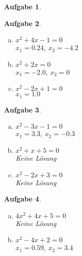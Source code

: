 \documentclass[12pt]{article}
\theoremstyle{note}
\newtheorem{aufgabe}{Aufgabe}
\begin{document}
\begin{flushleft}
\begin{aufgabe}
\begin{multicols}{3}
\begin{enumerate}[a)]
\end{enumerate} 
\end{multicols} 
\end{aufgabe}\vspace{1em}\begin{aufgabe} ~ \ 
\begin{multicols}{3} 
\begin{enumerate}[a)] 
\item $x^{2} + 4 x - 1 = 0$\\
{\tiny $x_1=$$0.24$}{\tiny   ,     $ x_2=$$-4.2$}

\item $x^{2} + 2 x = 0$\\
{\tiny $x_1=$$-2.0$}{\tiny   ,     $ x_2=$$0$}

\item $x^{2} - 2 x + 1 = 0$\\
{\tiny $x_1=$$1.0$}

\end{enumerate} 
\end{multicols} 
\end{aufgabe}\vspace{1em}\begin{aufgabe} ~ \ 
\begin{multicols}{3} 
\begin{enumerate}[a)] 
\item $x^{2} - 3 x - 1 = 0$\\
{\tiny $x_1=$$3.3$}{\tiny   ,     $ x_2=$$-0.3$}

\item $x^{2} + x + 5 = 0$\\
{\tiny Keine Lösung}

\item $x^{2} - 2 x + 3 = 0$\\
{\tiny Keine Lösung}

\end{enumerate} 
\end{multicols} 
\end{aufgabe}\vspace{1em}\begin{aufgabe} ~ \ 
\begin{multicols}{3} 
\begin{enumerate}[a)] 
\item $4 x^{2} + 4 x + 5 = 0$\\
{\tiny Keine Lösung}

\item $x^{2} - 4 x + 2 = 0$\\
{\tiny $x_1=$$0.59$}{\tiny   ,     $x_2=$$3.4$}


\end{enumerate}
\end{multicols}
\end{aufgabe}
\end{flushleft}
\end{document}

